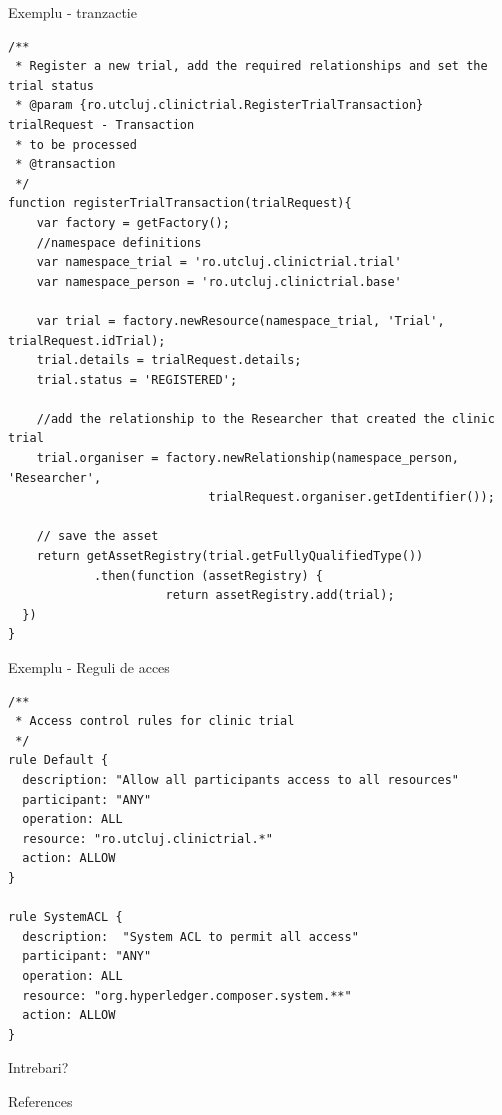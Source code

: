 \documentclass[10pt]{beamer}
\begin{document}
  \begin{frame}[fragile]{Exemplu - tranzactie}
  	\begin{Verbatim}[fontsize=\tiny]
/**
 * Register a new trial, add the required relationships and set the trial status
 * @param {ro.utcluj.clinictrial.RegisterTrialTransaction} trialRequest - Transaction
 * to be processed
 * @transaction
 */
function registerTrialTransaction(trialRequest){
    var factory = getFactory();
    //namespace definitions
    var namespace_trial = 'ro.utcluj.clinictrial.trial'
    var namespace_person = 'ro.utcluj.clinictrial.base'

    var trial = factory.newResource(namespace_trial, 'Trial', trialRequest.idTrial);
    trial.details = trialRequest.details;
    trial.status = 'REGISTERED';

    //add the relationship to the Researcher that created the clinic trial
    trial.organiser = factory.newRelationship(namespace_person, 'Researcher',
                            trialRequest.organiser.getIdentifier());

    // save the asset
    return getAssetRegistry(trial.getFullyQualifiedType())
            .then(function (assetRegistry) {
                      return assetRegistry.add(trial);
  })
} 	
  	\end{Verbatim}
  \end{frame}
  \begin{frame}[fragile]{Exemplu - Reguli de acces}
  	\begin{Verbatim}[fontsize=\tiny]
/**
 * Access control rules for clinic trial
 */
rule Default {
  description: "Allow all participants access to all resources"
  participant: "ANY"
  operation: ALL
  resource: "ro.utcluj.clinictrial.*"
  action: ALLOW
}

rule SystemACL {
  description:  "System ACL to permit all access"
  participant: "ANY"
  operation: ALL
  resource: "org.hyperledger.composer.system.**"
  action: ALLOW
}
	\end{Verbatim}
  \end{frame}
  \begin{frame}[standout]
  Intrebari?
  \end{frame}
  
  \begin{frame}[allowframebreaks]{References}

  
  

\end{frame}
\end{document}
